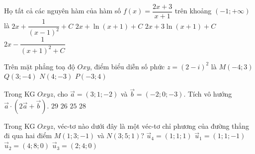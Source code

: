 \begin{ex}%
Họ tất cả các nguyên hàm của hàm số $f(x)=\dfrac{2x+3}{x+1}$ trên khoảng $(-1;+\infty)$ là	
	\choice
	{$2x+\dfrac{1}{(x-1)^2}+C$}
	{\True $2x+\ln (x+1)+C$}
	{$2x+3\ln(x+1)+C$}
	{$2x-\dfrac{1}{(x+1)^2+C}$}
\end{ex}

\begin{ex}%
	Trên mặt phẳng toạ độ $Oxy$, điểm biểu diễn số phức $z=(2-i)^2$  là
	\choice
	{$M(-4;3)$}
	{\True $Q(3;-4)$}
	{$N(4;-3)$}
	{$P(-3;4)$}
\end{ex}

\begin{ex}%
	Trong KG $Oxyz$, cho $\overrightarrow{a}=(3;1;-2)$ và $\overrightarrow{b}=(-2;0;-3)$. Tích vô hướng $\overrightarrow{a}\cdot \left( 2\overrightarrow{a}+\overrightarrow{b}\right) $.
	\choice
	{$29$}
	{$26$}
	{$25$}
	{\True $28$}
\end{ex}

\begin{ex}%
	Trong KG $Oxyz$, véc-tơ nào dưới đây là một véc-tơ chỉ phương của đường thẳng đi qua hai điểm $M(1;3;-1)$ và $N(3;5;1)$?
	\choice
	{\True $\overrightarrow{u}_4=(1;1;1)$}
	{$\overrightarrow{u}_1=(1;1;-1)$}
	{$\overrightarrow{u}_2=(4;8;0)$}
	{$\overrightarrow{u}_3=(2;4;0)$}
\end{ex}

